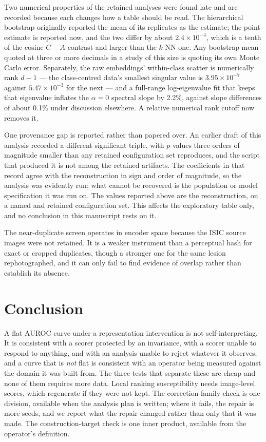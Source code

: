 \documentclass[11pt,a4paper]{article}
\begin{document}
Two numerical properties of the retained analyses were found late and are
recorded because each changes how a table should be read. The hierarchical
bootstrap originally reported the mean of its replicates as the estimate; the
point estimate is reported now, and the two differ by about $2.4\times10^{-4}$,
which is a tenth of the cosine $C-A$ contrast and larger than the $k$-NN one.
Any bootstrap mean quoted at three or more decimals in a study of this size is
quoting its own Monte Carlo error. Separately, the raw embeddings' within-class
scatter is numerically rank $d-1$ --- the class-centred data's smallest singular
value is $3.95\times10^{-7}$ against $5.47\times10^{-3}$ for the next --- and a
full-range log-eigenvalue fit that keeps that eigenvalue inflates the
$\alpha=0$ spectral slope by 2.2\%, against slope differences of about 0.1\%
under discussion elsewhere. A relative numerical rank cutoff now removes it.

One provenance gap is reported rather than papered over. An earlier draft of this analysis recorded a different significant triple, with $p$-values three orders of magnitude smaller than any retained configuration set reproduces, and the script that produced it is not among the retained artifacts. The coefficients in that record agree with the reconstruction in sign and order of magnitude, so the analysis was evidently run; what cannot be recovered is the population or model specification it was run on. The values reported above are the reconstruction, on a named and retained configuration set. This affects the exploratory table only, and no conclusion in this manuscript rests on it.

The near-duplicate screen operates in encoder space because the ISIC source images were not retained. It is a weaker instrument than a perceptual hash for exact or cropped duplicates, though a stronger one for the same lesion rephotographed, and it can only fail to find evidence of overlap rather than establish its absence.

\section{Conclusion}
A flat AUROC curve under a representation intervention is not self-interpreting.
It is consistent with a scorer protected by an invariance, with a scorer unable
to respond to anything, and with an analysis unable to reject whatever it
observes; and a curve that is \emph{not} flat is consistent with an operator
being measured against the domain it was built from. The three tests that
separate these are cheap and none of them requires more data. Local ranking
susceptibility needs image-level scores, which regenerate if they were not
kept. The correction-family check is one division, available when the analysis
plan is written; where it fails, the repair is more seeds, and we report what
the repair changed rather than only that it was made. The construction-target check is one inner product, available
from the operator's definition.
\end{document}
